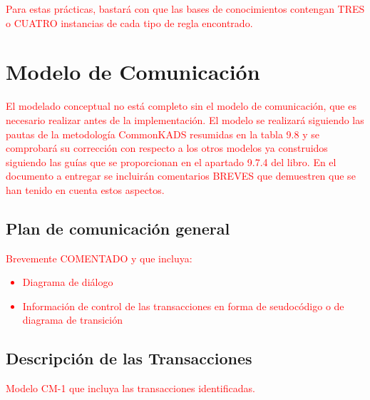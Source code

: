 \documentclass[12pt,a4paper,twoside,spanish]{article}      %
\begin{document}
\textcolor {red} {Para estas prácticas, bastará con que las bases de conocimientos contengan TRES o CUATRO instancias de cada tipo de regla encontrado.}

\section{Modelo de Comunicación}

\textcolor {red} {El modelado conceptual no está completo sin el modelo de comunicación, que es necesario realizar antes de la implementación. El modelo se realizará siguiendo las pautas de la metodología CommonKADS resumidas en la tabla 9.8 y se comprobará su corrección con respecto a los otros modelos ya construidos siguiendo las guías que se proporcionan en el apartado 9.7.4 del libro. En el documento a entregar se incluirán comentarios BREVES que demuestren que se han tenido en cuenta estos aspectos.}

\subsection{Plan de comunicación general}

\textcolor {red}
{
Brevemente COMENTADO y que incluya:
\begin{itemize}
 \item Diagrama de diálogo
 \item Información de control de las transacciones en forma de
seudocódigo o de diagrama de transición
\end{itemize}
}

\subsection{Descripción de las Transacciones}
\textcolor {red} {Modelo CM-1 que incluya las transacciones identificadas.}
\end{document}
